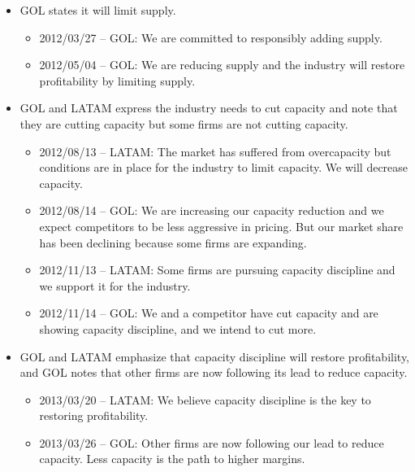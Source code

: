 \begin{itemize}
\item GOL states it will limit supply.

\begin{itemize}
\item 2012/03/27 -- GOL: We are committed to responsibly adding supply.


\item 2012/05/04 -- GOL: We are reducing supply and the industry will
restore profitability by limiting supply.
\end{itemize}

\item GOL and LATAM express the industry needs to cut capacity and note that
they are cutting capacity but some firms are not cutting capacity.

\begin{itemize}
\item 2012/08/13 -- LATAM: The market has suffered from overcapacity but
conditions are in place for the industry to limit capacity. We will decrease
capacity.

\item 2012/08/14 -- GOL: We are increasing our capacity reduction and we
expect competitors to be less aggressive in pricing. But our market share
has been declining because some firms are expanding.

\item 2012/11/13 -- LATAM: Some firms are pursuing capacity discipline and
we support it for the industry.

\item 2012/11/14 -- GOL: We and a competitor have cut capacity and are
showing capacity discipline, and we intend to cut more.
\end{itemize}

\item GOL and LATAM emphasize that capacity discipline will restore
profitability, and GOL notes that other firms are now following its lead to
reduce capacity.

\begin{itemize}
\item 2013/03/20 -- LATAM: We believe capacity discipline is the key to
restoring profitability.

\item 2013/03/26 -- GOL: Other firms are now following our lead to reduce
capacity. Less capacity is the path to higher margins.
\end{itemize}


\end{itemize}
